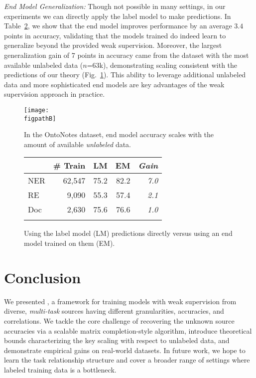\documentclass[letterpaper]{article}
\newcommand{\AvgEMOverLM}[0]{3.4}
\begin{document}
\textit{End Model Generalization:}
Though not possible in many settings, in our experiments we can directly apply the label model to make predictions.
In Table~\ref{tab:end_model_boost}, we show that the end model improves performance by an average $\AvgEMOverLM$ points in accuracy, validating that the models trained do indeed learn to generalize beyond the provided weak supervision.
Moreover, the largest generalization gain of 7 points in accuracy came from the dataset with the most available unlabeled data ($n$=63k), demonstrating scaling consistent with the predictions of our theory (Fig.~\ref{fig:onto_scale}).
This ability to leverage additional unlabeled data and more sophisticated end models are key advantages of the weak supervision approach in practice.

\begin{figure}
  \centering
  \texttt{[image: \\figpathB]}\caption{In the OntoNotes dataset, end model accuracy scales with the amount of available \textit{unlabeled} data.}
  \label{fig:onto_scale}
\end{figure}

\begin{figure}
  \centering
\begin{tabular}{lrrrr}
      \toprule
        & \# Train & LM & EM & \textit{Gain} \\
      \midrule
      NER
        & 62,547
        & 75.2
        & 82.2
        & \textit{7.0}
        \\
      RE
        & 9,090
        & 55.3
        & 57.4
        & \textit{2.1}
        \\
      Doc
        & 2,630
        & 75.6
        & 76.6
        & \textit{1.0}
        \\
      \bottomrule\\
    \end{tabular}
  \caption{Using the label model (LM) predictions directly versus using an end model trained on them (EM).}
  \label{tab:end_model_boost}
\end{figure}
 
\section{Conclusion}
\label{sec:conclusion}


We presented \systemx, a framework for training models with weak supervision from diverse, \textit{multi-task} sources having different granularities, accuracies, and correlations.
We tackle the core challenge of recovering the unknown source accuracies via a scalable matrix completion-style algorithm, introduce theoretical bounds characterizing the key scaling with respect to unlabeled data, and demonstrate empirical gains on real-world datasets.
In future work, we hope to learn the task relationship structure and cover a broader range of settings where labeled training data is a bottleneck.
\end{document}

